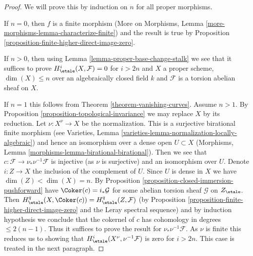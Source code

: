 \begin{proof}
We will prove this by induction on $n$ for all proper morphisms.

\medskip\noindent
If $n = 0$, then $f$ is a finite morphism
(More on Morphisms, Lemma \ref{more-morphisms-lemma-characterize-finite})
and the
result is true by Proposition \ref{proposition-finite-higher-direct-image-zero}.

\medskip\noindent
If $n > 0$, then using Lemma \ref{lemma-proper-base-change-stalk}
we see that it suffices to prove $H^i_\etale(X, \mathcal{F}) = 0$
for $i > 2n$ and $X$ a proper scheme, $\dim(X) \leq n$
over an algebraically closed field $k$
and $\mathcal{F}$ is a torsion abelian sheaf on $X$.

\medskip\noindent
If $n = 1$ this follows from Theorem \ref{theorem-vanishing-curves}.
Assume $n > 1$. By Proposition \ref{proposition-topological-invariance}
we may replace $X$ by its reduction.
Let $\nu : X^\nu \to X$ be the normalization.
This is a surjective birational finite morphism
(see Varieties, Lemma \ref{varieties-lemma-normalization-locally-algebraic})
and hence an isomorphism over a dense open $U \subset X$
(Morphisms, Lemma \ref{morphisms-lemma-birational-birational}).
Then we see that
$c : \mathcal{F} \to \nu_*\nu^{-1}\mathcal{F}$ is injective
(as $\nu$ is surjective) and an isomorphism over $U$.
Denote $i : Z \to X$ the inclusion of the complement of $U$.
Since $U$ is dense in $X$ we have $\dim(Z) < \dim(X) = n$.
By Proposition \ref{proposition-closed-immersion-pushforward} have
$\Coker(c) = i_*\mathcal{G}$ for some
abelian torsion sheaf $\mathcal{G}$ on $Z_\etale$.
Then $H^q_\etale(X, \Coker(c)) = H^q_\etale(Z, \mathcal{F})$
(by Proposition \ref{proposition-finite-higher-direct-image-zero}
and the Leray spectral sequence) and by induction hypothesis we conclude that
the cokernel of $c$ has cohomology in degrees $\leq 2(n - 1)$.
Thus it suffices to prove the result for $\nu_*\nu^{-1}\mathcal{F}$.
As $\nu$ is finite this reduces us to showing
that $H^i_\etale(X^\nu, \nu^{-1}\mathcal{F})$ is
zero for $i > 2n$. This case is treated in the next paragraph.


\end{proof}
